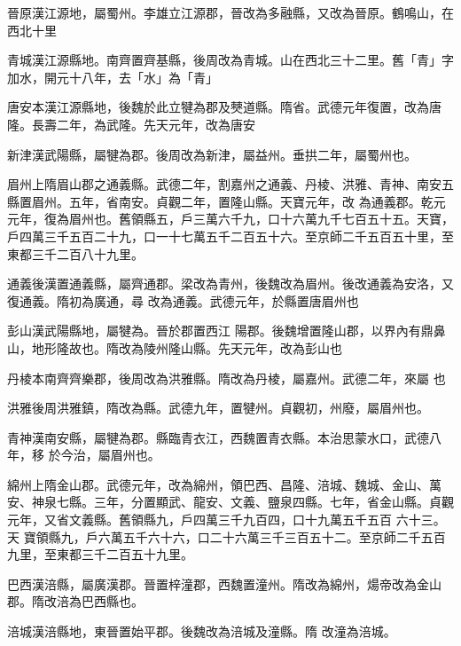 \begin{pinyinscope}
 晉原漢江源地，屬蜀州。李雄立江源郡，晉改為多融縣，又改為晉原。鶴鳴山，在西北十里



 青城漢江源縣地。南齊置齊基縣，後周改為青城。山在西北三十二里。舊「青」字
 加水，開元十八年，去「水」為「青」



 唐安本漢江源縣地，後魏於此立犍為郡及僰道縣。隋省。武德元年復置，改為唐隆。長壽二年，為武隆。先天元年，改為唐安



 新津漢武陽縣，屬犍為郡。後周改為新津，屬益州。垂拱二年，屬蜀州也。



 眉州上隋眉山郡之通義縣。武德二年，割嘉州之通義、丹棱、洪雅、青神、南安五縣置眉州。五年，省南安。貞觀二年，置隆山縣。天寶元年，改
 為通義郡。乾元元年，復為眉州也。舊領縣五，戶三萬六千九，口十六萬九千七百五十五。天寶，戶四萬三千五百二十九，口一十七萬五千二百五十六。至京師二千五百五十里，至東都三千二百八十九里。



 通義後漢置通義縣，屬齊通郡。梁改為青州，後魏改為眉州。後改通義為安洛，又復通義。隋初為廣通，尋
 改為通義。武德元年，於縣置唐眉州也



 彭山漢武陽縣地，屬犍為。晉於郡置西江
 陽郡。後魏增置隆山郡，以界內有鼎鼻山，地形隆故也。隋改為陵州隆山縣。先天元年，改為彭山也



 丹棱本南齊齊樂郡，後周改為洪雅縣。隋改為丹棱，屬嘉州。武德二年，來屬
 也



 洪雅後周洪雅鎮，隋改為縣。武德九年，置犍州。貞觀初，州廢，屬眉州也。



 青神漢南安縣，屬犍為郡。縣臨青衣江，西魏置青衣縣。本治思蒙水口，武德八年，移
 於今治，屬眉州也。



 綿州上隋金山郡。武德元年，改為綿州，領巴西、昌隆、涪城、魏城、金山、萬安、神泉七縣。三年，分置顯武、龍安、文義、鹽泉四縣。七年，省金山縣。貞觀元年，又省文義縣。舊領縣九，戶四萬三千九百四，口十九萬五千五百
 六十三。天
 寶領縣九，戶六萬五千六十六，口二十六萬三千三百五十二。至京師二千五百九里，至東都三千二百五十九里。



 巴西漢涪縣，屬廣漢郡。晉置梓潼郡，西魏置潼州。隋改為綿州，煬帝改為金山郡。隋改涪為巴西縣也。



 涪城漢涪縣地，東晉置始平郡。後魏改為涪城及潼縣。隋
 改潼為涪城。




\end{pinyinscope}

